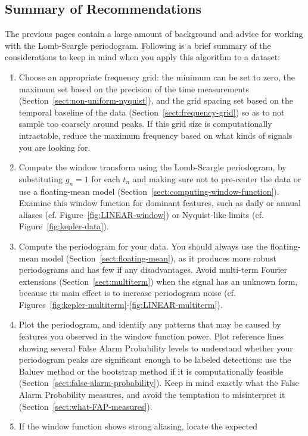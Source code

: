 \documentclass[preprint]{aastex}
\newcommand{\fig}[1]{Figure~\ref{fig:#1}}
\newcommand{\figs}[2]{Figures~\ref{fig:#1}-\ref{fig:#2}}
\newcommand{\Sect}[1]{Section~\ref{sect:#1}}
\newcommand{\sect}[1]{\Sect{#1}}
\newcommand{\sectlabel}[1]{\label{sect:#1}}
\begin{document}
\subsection{Summary of Recommendations}
\sectlabel{summary}
The previous pages contain a large amount of background and advice for working
with the Lomb-Scargle periodogram.
Following is a brief summary of the considerations to keep in mind when you
apply this algorithm to a dataset:
\begin{enumerate}
  \item Choose an appropriate frequency grid: the minimum can be set to zero,
    the maximum set based on the precision of the time measurements
    (\sect{non-uniform-nyquist}), and the grid spacing set based on the
    temporal baseline of the data (\sect{frequency-grid})
    so as to not sample too coarsely around peaks.
    If this grid size is computationally intractable, reduce the maximum
    frequency based on what kinds of signals you are looking for.
  \item Compute the window transform using the Lomb-Scargle periodogram,
    by substituting $g_n=1$ for each $t_n$ and making sure not to pre-center
    the data or use a floating-mean model (\sect{computing-window-function}).
    Examine this window function for dominant features, such as daily or
    annual aliases (cf. \fig{LINEAR-window})
    or Nyquist-like limits (cf. \fig{kepler-data}).
  \item Compute the periodogram for your data. You should always use the
    floating-mean model (\sect{floating-mean}), as it produces more robust
    periodograms and has few if any disadvantages. Avoid multi-term Fourier
    extensions (\sect{multiterm}) when the signal has an unknown form, because
    its main effect is to increase periodogram noise
    (cf. \figs{kepler-multiterm}{LINEAR-multiterm}).
  \item Plot the periodogram, and identify any patterns that may be caused
    by features you observed in the window function power. Plot reference
    lines showing several False Alarm Probability levels to understand whether
    your periodogram peaks are significant enough to be labeled detections:
    use the Baluev method or the bootstrap method if it is computationally
    feasible (\sect{false-alarm-probability}).
    Keep in mind exactly what the False Alarm Probability measures, and
    avoid the temptation to misinterpret it (\sect{what-FAP-measures}).
  \item If the window function shows strong aliasing, locate the expected

\end{enumerate}
\end{document}

